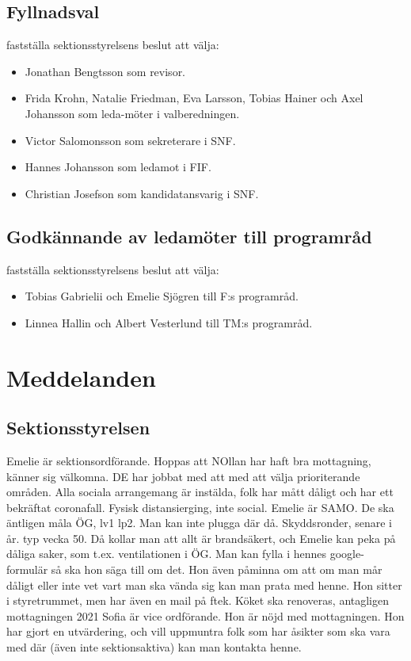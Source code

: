 \documentclass{sektionsmote}
\begin{document}
\subsection{Fyllnadsval}
\begin{beslut}
    \item fastställa sektionsstyrelsens beslut att välja:
    \begin{itemize}
        \item Jonathan Bengtsson som revisor.
        \item Frida Krohn, Natalie Friedman, Eva Larsson, Tobias Hainer och Axel Johansson som leda-möter i valberedningen.
        \item Victor Salomonsson som sekreterare i SNF.
        \item Hannes Johansson som ledamot i FIF.
        \item Christian Josefson som kandidatansvarig i SNF.
    \end{itemize}
\end{beslut}

\subsection{Godkännande av ledamöter till programråd}
\begin{beslut}
    \item fastställa sektionsstyrelsens beslut att välja:
    \begin{itemize}
        \item Tobias Gabrielii och Emelie Sjögren till F:s programråd.
        \item Linnea Hallin och Albert Vesterlund till TM:s programråd.
    \end{itemize}
\end{beslut}


\section{Meddelanden}

\subsection{Sektionsstyrelsen}
Emelie är sektionsordförande. Hoppas att NOllan har haft bra mottagning, känner sig välkomna.
DE har jobbat med att med att välja prioriterande områden.
Alla sociala arrangemang är instälda, folk har mått dåligt och har ett bekräftat coronafall. Fysisk distansierging, inte social.
Emelie är SAMO.
De ska äntligen måla ÖG, lv1 lp2. Man kan inte plugga där då.
Skyddsronder, senare i år. typ vecka 50. Då kollar man att allt är brandsäkert, och Emelie kan peka på dåliga saker, som t.ex. ventilationen i ÖG. Man kan fylla i hennes google-formulär så ska hon säga till om det.
Hon även påminna om att om man mår dåligt eller inte vet vart man ska vända sig kan man prata med henne. Hon sitter i styretrummet, men har även en mail på ftek.
Köket ska renoveras, antagligen mottagningen 2021
Sofia är vice ordförande. Hon är nöjd med mottagningen. Hon har gjort en utvärdering, och vill uppmuntra folk som har åsikter som ska vara med där (även inte sektionsaktiva) kan man kontakta henne.
\end{document}
